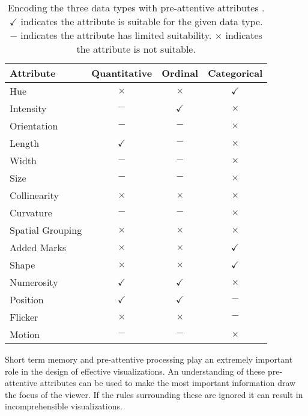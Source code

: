 \documentclass[a4paper, 11pt, titlepage, onehalfspacing]{report}
\begin{document}
\begin{table}[!ht]
\centering
    \begin{tabular}{lccc}
    \hline
    Attribute        & Quantitative & Ordinal      & Categorical  \\ \hline
    Hue              & $\times$     & $\times$     & $\checkmark$ \\
    Intensity        & $-$          & $\checkmark$ & $\times$     \\ \hline
    Orientation      & $-$          & $-$          & $\times$     \\
    Length           & $\checkmark$ & $-$          & $\times$     \\
    Width            & $-$          & $-$          & $\times$     \\
    Size             & $-$          & $-$          & $\times$     \\
    Collinearity     & $\times$     & $\times$     & $\times$     \\
    Curvature        & $-$          & $-$          & $\times$     \\
    Spatial Grouping & $\times$     & $\times$     & $\times$     \\
    Added Marks      & $\times$     & $\times$     & $\checkmark$ \\
    Shape            & $\times$     & $\times$     & $\checkmark$ \\
    Numerosity       & $\checkmark$ & $\checkmark$ & $\times$     \\ \hline
    Position         & $\checkmark$ & $\checkmark$ & $-$          \\ \hline
    Flicker          & $\times$     & $\times$     & $-$          \\
    Motion           & $-$          & $-$          & $\times$     \\
    \end{tabular}
    \caption{ Encoding the three data types with pre-attentive attributes \protect\cite{mazza2009introduction}. $\checkmark$ indicates the attribute is suitable for the given data type. $-$ indicates the attribute has limited suitability. $\times$ indicates the attribute is not suitable. }
    \label{attribute_table}

\end{table}

Short term memory and pre-attentive processing play an extremely important role in the design of effective visualizations. An understanding of these pre-attentive attributes can be used to make the most important information draw the focus of the viewer. If the rules surrounding these are ignored it can result in incomprehensible visualizations.
\end{document}
